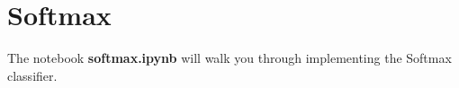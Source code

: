 \section{Softmax}

The notebook \textbf{softmax.ipynb} will walk you through implementing the Softmax classifier.